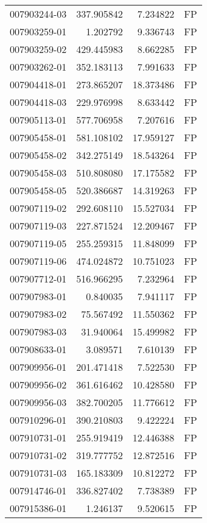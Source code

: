 \begin{tabular}{lrrl}
007903244-03 &  337.905842 &     7.234822 &   FP \\
007903259-01 &    1.202792 &     9.336743 &   FP \\
007903259-02 &  429.445983 &     8.662285 &   FP \\
007903262-01 &  352.183113 &     7.991633 &   FP \\
007904418-01 &  273.865207 &    18.373486 &   FP \\
007904418-03 &  229.976998 &     8.633442 &   FP \\
007905113-01 &  577.706958 &     7.207616 &   FP \\
007905458-01 &  581.108102 &    17.959127 &   FP \\
007905458-02 &  342.275149 &    18.543264 &   FP \\
007905458-03 &  510.808080 &    17.175582 &   FP \\
007905458-05 &  520.386687 &    14.319263 &   FP \\
007907119-02 &  292.608110 &    15.527034 &   FP \\
007907119-03 &  227.871524 &    12.209467 &   FP \\
007907119-05 &  255.259315 &    11.848099 &   FP \\
007907119-06 &  474.024872 &    10.751023 &   FP \\
007907712-01 &  516.966295 &     7.232964 &   FP \\
007907983-01 &    0.840035 &     7.941117 &   FP \\
007907983-02 &   75.567492 &    11.550362 &   FP \\
007907983-03 &   31.940064 &    15.499982 &   FP \\
007908633-01 &    3.089571 &     7.610139 &   FP \\
007909956-01 &  201.471418 &     7.522530 &   FP \\
007909956-02 &  361.616462 &    10.428580 &   FP \\
007909956-03 &  382.700205 &    11.776612 &   FP \\
007910296-01 &  390.210803 &     9.422224 &   FP \\
007910731-01 &  255.919419 &    12.446388 &   FP \\
007910731-02 &  319.777752 &    12.872516 &   FP \\
007910731-03 &  165.183309 &    10.812272 &   FP \\
007914746-01 &  336.827402 &     7.738389 &   FP \\
007915386-01 &    1.246137 &     9.520615 &   FP \\

\end{tabular}
